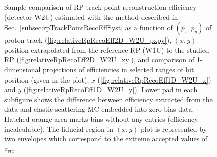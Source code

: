 \begin{figure}[h]
{\begin{subfigure}[b]{\linewidth}
		\end{subfigure}
	}
	\caption[Coparison of estimated RP track point reconstruction efficiency in 2D and 1D (detector W2U).]%
	{Sample comparison of RP track point reconstruction efficiency (detector W2U) estimated with the method described in Sec.~\ref{subsec:rpTrackPointRecoEffSyst} as a function of $(p_{x},p_{y})$ of proton track (\ref{fig:relativeRpRecoEff2D_W2U_pxpy}), $(x,y)$ position extrapolated from the reference RP (W1U) to the studied RP (\ref{fig:relativeRpRecoEff2D_W2U_xy}), and comparison of 1-dimensional projections of efficiencies in selected ranges of hit position (given in the plot): $x$ (\ref{fig:relativeRpRecoEff1D_W2U_x}) and $y$ (\ref{fig:relativeRpRecoEff1D_W2U_y}). Lower pad in each subfigure shows the difference between efficiency extracted from the data and elastic scattering MC embedded into zero-bias data. Hatched orange area marks bins without any entries (efficiency incalculable). The fiducial region in $(x,y)$ plot is represented by two envelopes which correspond to the extreme accepted values of $z_{vtx}$.%
	}\label{fig:relativeRpRecoEff_W2U}
\end{figure}










